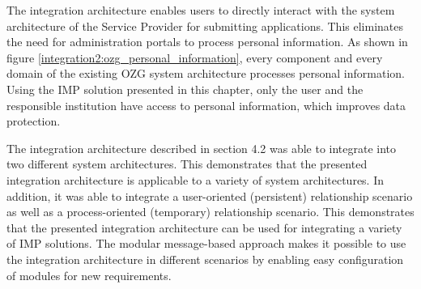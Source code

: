 The integration architecture enables users to directly interact with the system architecture of the Service Provider for submitting applications. This eliminates the need for administration portals to process personal information. As shown in figure \ref{integration2:ozg_personal_information}, every component and every domain of the existing OZG system architecture processes personal information. Using the IMP solution presented in this chapter, only the user and the responsible institution have access to personal information, which improves data protection.

The integration architecture described in section 4.2 was able to integrate into two different system architectures. This demonstrates that the presented integration architecture is applicable to a variety of system architectures. In addition, it was able to integrate a user-oriented (persistent) relationship scenario as well as a process-oriented (temporary) relationship scenario. This demonstrates that the presented integration architecture can be used for integrating a variety of IMP solutions. The modular message-based approach makes it possible to use the integration architecture in different scenarios by enabling easy configuration of modules for new requirements.
